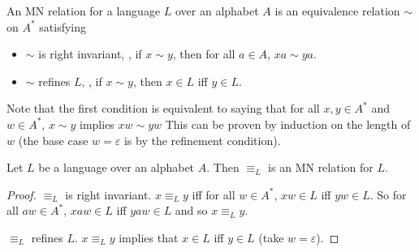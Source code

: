\begin{definition*} \label{def:mn}
    An MN relation for a language $L$ over an alphabet $A$ is an equivalence
    relation $\sim$ on $A^*$ satisfying
    \begin{itemize}
        \item $\sim$ is right invariant, \ie, if $x \sim y$, then for all
        $a \in A$, $xa \sim ya$.
        \item $\sim$ refines $L$, \ie, if $x \sim y$, then $x \in L$ iff
        $y \in L$.
    \end{itemize}
\end{definition*}
Note that the first condition is equivalent to saying that for all
$x, y \in A^*$ and $w \in A^*$, $x \sim y$ implies $xw \sim yw$
This can be proven by induction on the length of $w$ (the base case
$w = \varepsilon$ is by the refinement condition).

\begin{proposition*} \label{thm:mn:canonical}
   Let $L$ be a language over an alphabet $A$.
    Then $\equiv_L$ is an MN relation for $L$.
\end{proposition*}
\begin{proof}
    $\equiv_L$ is right invariant.
    $x \equiv_L y$ iff for all $w \in A^*$, $xw \in L$ iff $yw \in L$.
    So for all $aw \in A^*$, $xaw \in L$ iff $yaw \in L$ and so
    $x \equiv_L y$.

    $\equiv_L$ refines $L$.
    $x \equiv_L y$ implies that $x \in L$ iff $y \in L$ (take
    $w = \varepsilon$).
\end{proof}


